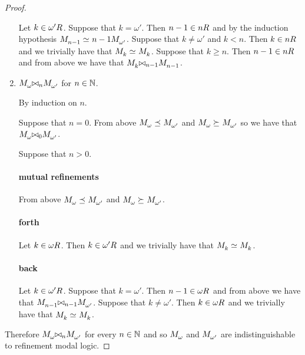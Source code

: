 \begin{proof}
\begin{enumerate}
    Let $k \in \kSuccessors{}{\omega'}$. 
    Suppose that $k = \omega'$. 
    Then $n - 1 \in \kSuccessors{}{n}$ and by the induction hypothesis $\kPModel{n - 1} \bisimilar{n - 1} \kPModel{\omega'}$.
    Suppose that $k \neq \omega'$ and $k < n$. Then $k \in \kSuccessors{}{n}$ and we trivially have that $\kPModel{k} \bisimilar \kPModel{k}$.
    Suppose that $k \geq n$. Then $n - 1 \in \kSuccessors{}{n}$ and from above we have that $\kPModel{k} \bisimref[n - 1] \kPModel{n - 1}$.
    
    \item $\kPModel{\omega} \bisimref[n] \kPModel{\omega'}$ for $n \in \mathbb{N}$.

    By induction on $n$.

    Suppose that $n = 0$. 
    From above $\kPModel{\omega} \refines \kPModel{\omega'}$ and  $\kPModel{\omega} \simulates \kPModel{\omega'}$ so we have that $\kPModel{\omega} \bisimref[0] \kPModel{\omega'}$.

    Suppose that $n > 0$.

    \paragraph{mutual refinements}

    From above $\kPModel{\omega} \refines \kPModel{\omega'}$ and  $\kPModel{\omega} \simulates \kPModel{\omega'}$.

    \paragraph{forth}

    Let $k \in \kSuccessors{}{\omega}$.
    Then $k \in \kSuccessors{}{\omega'}$ and we trivially have that $\kPModel{k} \bisimilar \kPModel{k}$.

    \paragraph{back}

    Let $k \in \kSuccessors{}{\omega'}$.
    Suppose that $k = \omega'$.
    Then $n - 1 \in \kSuccessors{}{\omega}$ and from above we have that $\kPModel{n - 1} \bisimref[n - 1] \kPModel{\omega'}$.
    Suppose that $k \neq \omega'$.
    Then $k \in \kSuccessors{}{\omega}$ and we trivially have that $\kPModel{k} \bisimilar \kPModel{k}$.
\end{enumerate}

Therefore $\kPModel{\omega} \bisimref[n] \kPModel{\omega'}$ for every $n \in \mathbb{N}$ and so $\kPModel{\omega}$ and $\kPModel{\omega'}$ are indistinguishable to refinement modal logic.


\end{proof}
